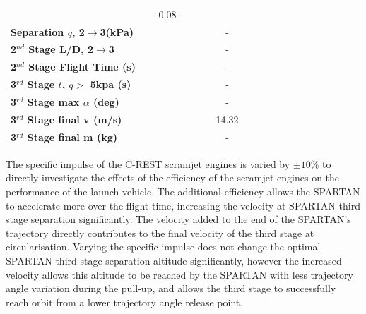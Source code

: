 \begin{table}[ht!]
\begin{tabular}{l c c c c c c}
		& \secondthirdSeparationgammaIspOneHundredTenNoReturn
		&-0.08
		\\
		\textbf{Separation $q$, 2$\rightarrow$3(kPa)}
		& \secondthirdSeparationqIspNinetyNoReturn
		& \secondthirdSeparationqIspNinetyFiveNoReturn
		& \secondthirdSeparationqIspStandardNoReturn
		& \secondthirdSeparationqIspOneHundredFiveNoReturn
		& \secondthirdSeparationqIspOneHundredTenNoReturn
		& -
		\\
		\textbf{2$^{nd}$ Stage L/D, 2$\rightarrow$3}
		& \secondthirdSeparationLDIspNinetyNoReturn
		& \secondthirdSeparationLDIspNinetyFiveNoReturn
		& \secondthirdSeparationLDIspStandardNoReturn
		& \secondthirdSeparationLDIspOneHundredFiveNoReturn
		& \secondthirdSeparationLDIspOneHundredTenNoReturn
		& -
		\\
		\textbf{2$^{nd}$ Stage Flight Time (s)}
		& \secondFlightTimeIspNinetyNoReturn
		& \secondFlightTimeIspNinetyFiveNoReturn
		& \secondFlightTimeIspStandardNoReturn
		& \secondFlightTimeIspOneHundredFiveNoReturn
		& \secondFlightTimeIspOneHundredTenNoReturn
		& -
		\\
		\textbf{3$^{rd}$ Stage $t$, $q >$ 5kpa (s)}
		& \thirdqOverFiveIspNinetyNoReturn
		& \thirdqOverFiveIspNinetyFiveNoReturn
		& \thirdqOverFiveIspStandardNoReturn
		& \thirdqOverFiveIspOneHundredFiveNoReturn
		& \thirdqOverFiveIspOneHundredTenNoReturn
		& -
		\\
		\textbf{3$^{rd}$ Stage max $\alpha$ (deg)}
		& \thirdmaxAoAIspNinetyNoReturn
		& \thirdmaxAoAIspNinetyFiveNoReturn
		& \thirdmaxAoAIspStandardNoReturn
		& \thirdmaxAoAIspOneHundredFiveNoReturn
		& \thirdmaxAoAIspOneHundredTenNoReturn
		& -
		\\
		\textbf{3$^{rd}$ Stage final v (m/s)}
		& \thirdcircvIspNinetyNoReturn
		& \thirdcircvIspNinetyFiveNoReturn
		& \thirdcircvIspStandardNoReturn
		& \thirdcircvIspOneHundredFiveNoReturn
		& \thirdcircvIspOneHundredTenNoReturn
		&14.32
		\\
		\textbf{3$^{rd}$ Stage final m (kg)}
		& \thirdcircmIspNinetyNoReturn
		& \thirdcircmIspNinetyFiveNoReturn
		& \thirdcircmIspStandardNoReturn
		& \thirdcircmIspOneHundredFiveNoReturn
		& \thirdcircmIspOneHundredTenNoReturn
		& -
		\\
		\hline 
	\end{tabular} 
\end{table}

The specific impulse of the C-REST scramjet engines is varied by $\pm10\%$ to directly investigate the effects of the efficiency of the scramjet engines on the performance of the launch vehicle. 
The additional efficiency allows the SPARTAN to accelerate more over the flight time, increasing the velocity at SPARTAN-third stage separation significantly. The velocity added to the end of the SPARTAN's trajectory directly contributes to the final velocity of the third stage at circularisation. Varying the specific impulse does not change the optimal SPARTAN-third stage separation altitude significantly, however the increased velocity allows this altitude to be reached by the SPARTAN with less trajectory angle variation during the pull-up, and allows the third stage to successfully reach orbit from a lower trajectory angle release point.




